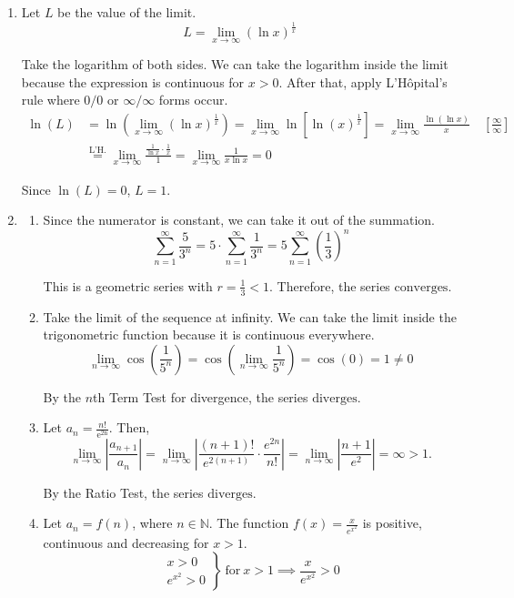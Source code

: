 \documentclass[a4paper, 12pt]{article}
\begin{document}
\begin{enumerate}[leftmargin=*,label=\textbf{\arabic*.}]
\item Let $L$ be the value of the limit.
\[L=\lim_{x\to\infty}(\ln x)^{\textstyle\frac1x}\]

Take the logarithm of both sides. We can take the logarithm inside the limit because the expression is continuous for $x>0$. After that, apply L'Hôpital's rule where $0/0$ or $\infty/\infty$ forms occur.
\begin{align*}
\ln(L)&=\ln\left(\lim_{x\to\infty}(\ln x)^{\textstyle\frac1x}\right)=\lim_{x\to\infty}\ln\left[\ln(x)^{\textstyle\frac1x}\right]=\lim_{x\to\infty}\frac{\ln(\ln x)}x\quad\left[\frac\infty\infty\right]\\[1em]&\overset{\text{L'H.}}{=}\lim_{x\to\infty}\frac{\displaystyle\frac1{\ln x}\cdot\frac1x}1=\lim_{x\to\infty}\frac1{x\ln x}=0
\end{align*}

Since $\ln(L)=0$, $\boxed{L=1}$.
\item
\begin{enumerate}[leftmargin=*,label=\textbf{\alph*.}]
\item Since the numerator is constant, we can take it out of the summation.
\[\sum_{n=1}^\infty\frac5{3^n}=5\cdot\sum_{n=1}^\infty\frac1{3^n}=5\sum_{n=1}^\infty\left(\frac13\right)^n\]

This is a geometric series with $\displaystyle r=\frac13<1$. Therefore, the series $\boxed{\text{converges}}$.

\item Take the limit of the sequence at infinity. We can take the limit inside the trigonometric function because it is continuous everywhere.
\[\lim_{n\to\infty}\cos\left(\frac1{5^n}\right)=\cos\left(\lim_{n\to\infty}\frac1{5^n}\right)=\cos(0)=1\neq0\]

By the $n$th Term Test for divergence, the series $\boxed{\text{diverges}}$.

\item Let $\displaystyle a_n=\frac{n!}{\mathrm{e^{2n}}}$. Then,
\[\lim_{n\to\infty}\left|\frac{a_{n+1}}{a_n}\right|=\lim_{n\to\infty}\left|\frac{(n+1)!}{ e^{2(n+1)}}\cdot\frac{ e^{2n}}{n!}\right|=\lim_{n\to\infty}\left|\frac{n+1}{ e^2}\right|=\infty>1.\]

By the Ratio Test, the series $\boxed{\text{diverges}}$.
\item Let $a_n=f(n)$, where $n\in\mathbb{N}$. The function $\displaystyle f(x)=\frac x{ e^{x^2}}$ is positive, continuous and decreasing for $x>1$.
\[\left.\begin{array}{c}
x>0\\
 e^{x^2}>0
\end{array}\right\}\:\text{for}\: x>1\implies\frac x{ e^{x^2}}>0\]


\end{enumerate}
\end{enumerate}
\end{document}
